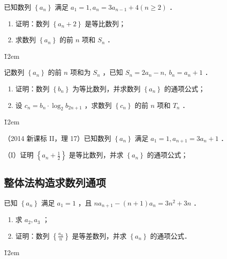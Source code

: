 \begin{example}
    已知数列 $\left\{a_n\right\}$ 满足 $a_1=1, a_n=3 a_{n-1}+4(n \geq 2)$ ．
    \begin{enumerate}
        \item 证明：数列 $\left\{a_n+2\right\}$ 是等比数列；
        \item 求数列 $\left\{a_n\right\}$ 的前 $n$ 项和 $S_n$ ．
    \end{enumerate}
\end{example}

\v{12em}

\begin{example}
    记数列 $\left\{a_n\right\}$ 的前 $n$ 项和为 $S_n$ ，已知 $S_n=2 a_n-n, ~ b_n=a_n+1$ ．
    \begin{enumerate}
        \item 证明：数列 $\left\{b_n\right\}$ 为等比数列，并求数列 $\left\{a_n\right\}$ 的通项公式；
        \item 设 $c_n=b_n \cdot \log _2 b_{2 n+1}$ ，求数列 $\left\{c_n\right\}$ 的前 $n$ 项和 $T_n$ ．
    \end{enumerate}
\end{example}

\v{12em}

\begin{example}
    （2014 新课标 II，理 17）已知数列 $\left\{a_n\right\}$ 满足 $a_1=1, a_{n+1}=3 a_n+1$ ．

    （I）证明 $\left\{a_n+\frac{1}{2}\right\}$ 是等比数列，并求 $\left\{a_n\right\}$ 的通项公式；
\end{example}

\vspace{10em}

\subsection{整体法构造求数列通项}

\begin{example}
    已知 $\left\{a_n\right\}$ 满足 $a_1=1$ ，且 $n a_{n+1}-(n+1) a_n=3 n^2+3 n$ ．
    \begin{enumerate}
        \item 求 $a_2, a_3$ ；
        \item 证明：数列 $\left\{\frac{a_n}{n}\right\}$ 是等差数列，并求 $\left\{a_n\right\}$ 的通项公式．
    \end{enumerate}
\end{example}

\v{12em}

